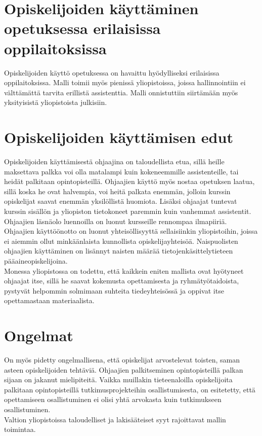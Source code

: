 \documentclass[finnish]{tktltiki2}
\theoremstyle{definition}
\theoremstyle{remark}
\begin{document}
\section{Opiskelijoiden käyttäminen opetuksessa erilaisissa oppilaitoksissa}
Opiskelijoiden käyttö opetuksessa on havaittu hyödylliseksi erilaisissa oppilaitoksissa. Malli toimii myös pienissä yliopistoissa, joissa hallinnointiin ei välttämättä tarvita erillistä assistenttia. Malli onnistuttiin siirtämään myös yksityisistä yliopistoista julkisiin.


\section{Opiskelijoiden käyttämisen edut}
Opiskelijoiden käyttämisestä ohjaajina on taloudellista etua, sillä heille maksettava palkka voi olla matalampi kuin kokeneemmille assistenteille, tai heidät palkitaan opintopisteillä. Ohjaajien käyttö myös nostaa opetuksen laatua, sillä koska he ovat halvempia, voi heitä palkata enemmän, jolloin kurssin opiskelijat saavat enemmän yksilöllistä huomiota. Lisäksi ohjaajat tuntevat kurssin sisällön ja yliopiston tietokoneet paremmin kuin vanhemmat assistentit. 
\\
Ohjaajien läsnäolo luennoilla on luonut kursseille rennompaa ilmapiiriä. Ohjaajien käyttöönotto on luonut yhteisöllisyyttä sellaisiinkin yliopistoihin, joissa ei aiemmin ollut minkäänlaista kunnollista opiskelijayhteisöä. Naispuolisten ohjaajien käyttäminen on lisännyt naisten määrää tietojenkäsittelytieteen pääaineopiskelijoina.
\\
Monessa yliopistossa on todettu, että kaikkein eniten mallista ovat hyötyneet ohjaajat itse, sillä he saavat kokemusta opettamisesta ja ryhmätyötaidoista, pystyvät helpommin solmimaan suhteita tiedeyhteisössä ja oppivat itse opettamastaan materiaalista.



\section{Ongelmat}
On myös pidetty ongelmallisena, että opiskelijat arvostelevat toisten, saman asteen opiskelijoiden tehtäviä. Ohjaajien palkitseminen opintopisteillä palkan sijaan on jakanut mielipiteitä. Vaikka muillakin tieteenaloilla opiskelijoita palkitaan opintopisteillä tutkimusprojekteihin osallistumisesta, on esitetetty, että opettamiseen osallistuminen ei olisi yhtä arvokasta kuin tutkimukseen osallistuminen.
\\
Valtion yliopistoissa taloudelliset ja lakisääteiset syyt rajoittavat mallin toimintaa. 




\end{document}
